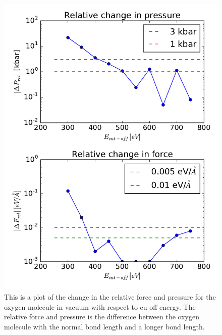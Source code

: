 \begin{figure}[H]
\includegraphics[width=\linewidth]{../fig/oxygen/deltaforcepressrel.pdf}\caption{This is a plot of the change in the relative force and pressure for the oxygen molecule in vacuum with respect to cu-off energy. The relative force and pressure is the difference between the oxygen molecule with the normal bond length and a longer bond length.}\label{fig:forcepresscutoff_O2}
\end{figure}


